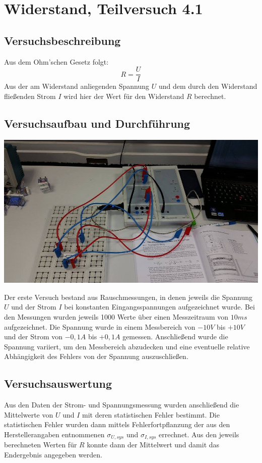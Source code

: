\documentclass[12pt,a4paper]{article}
\author{Gruppe C14 \\ Julián Häck, Martin Koytek, Lars Wenning, Erik Zimmermann}
\begin{document}
\section{Widerstand, Teilversuch 4.1}
\subsection{Versuchsbeschreibung}
Aus dem Ohm'schen Gesetz folgt:
\[R=\frac{U}{I}\]
Aus der am Widerstand anliegenden Spannung $U$ und dem durch den Widerstand fließenden Strom $I$ wird hier der Wert für den Widerstand $R$ berechnet.
\subsection{Versuchsaufbau und Durchführung}
\begin{center}
\includegraphics[scale=0.35]{12000155_1207085929316467_1534534399_n.jpg}
\end{center}

Der erste Versuch bestand aus Rauschmessungen, in denen jeweils die Spannung $U$ und der Strom $I$ bei konstanten Eingangsspannungen aufgezeichnet wurde.
Bei den Messungen wurden jeweils 1000 Werte über einen Messzeitraum von $10ms$ aufgezeichnet. Die Spannung wurde in einem Messbereich von $-10V$ bis $+10V$ und der Strom von $-0,1A$ bis $+0,1A$ gemessen.
Anschließend wurde die Spannung variiert, um den Messbereich abzudecken und eine eventuelle relative Abhängigkeit des Fehlers von der Spannung auszuschließen. 

\subsection{Versuchsauswertung}
Aus den Daten der Strom- und Spannungsmessung wurden anschließend die Mittelwerte von $U$ und $I$ mit deren statistischen Fehler bestimmt.
Die statistischen Fehler wurden dann mittels Fehlerfortpflanzung der aus den Herstellerangaben entnommenen $\sigma_{U,sys}$ und $\sigma_{I,sys}$ errechnet. 
Aus den jeweils berechneten Werten für $R$ konnte dann der Mittelwert und damit das Endergebnis angegeben werden.
\end{document}
